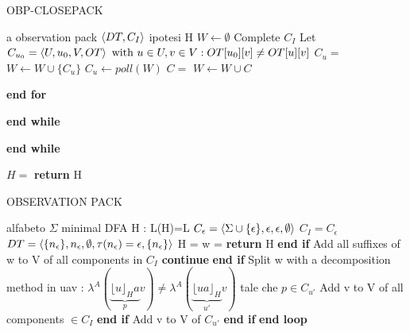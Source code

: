 \begin{algorithm}
\caption{OBP-CLOSEPACK}\label{alg:clp}
\begin{algorithmic}[1]
\Statex
\Input a observation pack $\Braket{DT,C_{I}}$
\Output ipotesi H
\State $W \gets \emptyset $  
     \State Complete $C_I$
     \State Let $C_{u_{0}} = \Braket{U,u_0,V,OT} \text{ with } u \in U, v \in V : OT[u_0][v] \neq OT[u][v]$
     \State $C_u = $ 
     \State $W \gets W \cup \{C_u\}$
     \State $C_u \gets poll(W)$ 
     \State $C = $ 
     \State $W \gets W \cup C$
     \EndIf
    
     \EndFor
      \State \textbf{end for}
     
     \EndWhile
     \State \textbf{end while}
    
    \EndWhile
    \State \textbf{end while} 
    
    \State $H= $ 
    \State \textbf{return } H
     
\end{algorithmic}
\end{algorithm}

\begin{algorithm}
\caption{OBSERVATION PACK}\label{alg:obpp}
\begin{algorithmic}[1]
\Statex
\Input alfabeto $\Sigma$ 
\Output minimal DFA H : L(H)=\ac{L}  
\State $C_{\epsilon}=\Braket{\Sigma \cup \{\epsilon\},\epsilon,\epsilon,\emptyset}$
\State $C_I = C_{\epsilon}$ 
    \State $DT = \Braket{\{n_{\epsilon}\},n_{\epsilon},\emptyset,\tau(n_{\epsilon})=\epsilon,\{n_{\epsilon}\}}$
    \Loop
    \State H = 
    \State w = 
    \State \textbf{return} H 
    \EndIf
    \State \textbf{end if}
    \State Add all suffixes of w to V of all components in $C_I$
    \State \textbf{continue}
    \EndIf
    \State \textbf{end if}
    \State Split w with a decomposition method in uav : $\lambda^{A}(\underbrace{\lfloor u \rfloor_{H}a}_{p} v) \neq \lambda^{A}(\underbrace{\lfloor ua
     \rfloor_{H}}_{u'}v)$
     \Statex \quad \: tale che $p \in C_{u'}$
    \State Add v to V of all components $\in C_I$
    \EndIf
    \State \textbf{end if}
    \State Add v to V of $ C_{u'}$
    \EndIf
    \State \textbf{end if}
    \EndLoop
    \State \textbf{end loop}
     
\end{algorithmic}
\end{algorithm}

